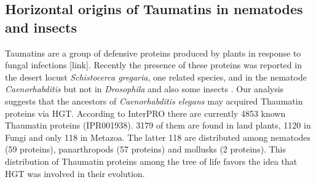 \subsection{Horizontal origins of Taumatins in nematodes and insects} Taumatins
are a group of defensive proteins produced by plants in response to fungal
infections [link]. Recently the presence of these proteins was reported in the
desert locust \textit{Schistocerca gregaria}, one related species, and in the
nematode \textit{Caenorhabditis} but not in \textit{Drosophila} and also some
insects \cite{Brandazza2004}. Our analysis suggests that the ancestors of
\textit{Caenorhabditis elegans} may acquired Thaumatin proteins via HGT.
According to InterPRO \cite{Finn2017} there are currently 4853 known Thaumatin
proteins (IPR001938). 3179 of them are found in land plants, 1120 in Fungi and
only 118 in Metazoa. The latter 118 are distributed among nematodes (59
proteins), panarthropods (57 proteins) and mollusks (2 proteins). This
distribution of Thaumatin proteins among the tree of life favors the idea that
HGT was involved in their evolution.
